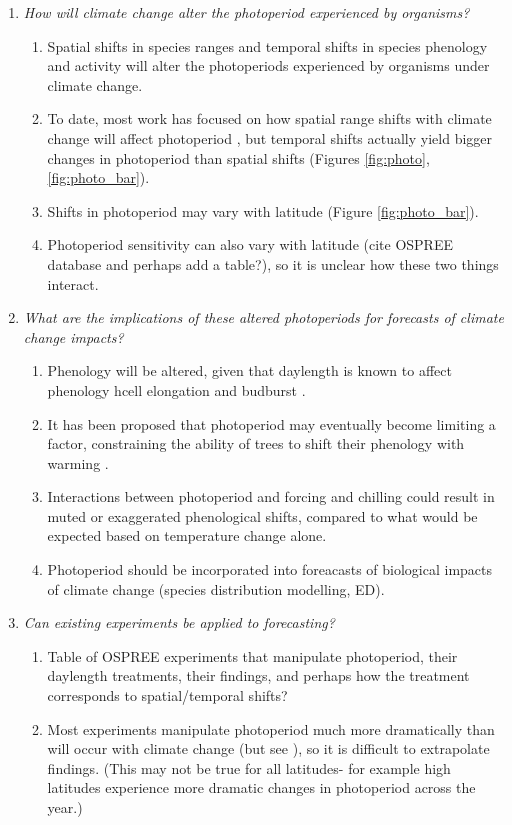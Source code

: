 \documentclass{article}
\begin{document}
\begin{enumerate}
\item\textit{How will climate change alter the photoperiod experienced by organisms?}
\begin{enumerate}
\item Spatial shifts in species ranges and temporal shifts in species phenology and activity will alter the photoperiods experienced by organisms under climate change.
\item  To date, most work has focused on how spatial range shifts with climate change will affect photoperiod \citep{saikkonen2012}, but temporal shifts actually yield bigger changes in photoperiod than spatial shifts  (Figures \ref{fig:photo},\ref{fig:photo_bar}).
\item Shifts in photoperiod may vary with latitude (Figure \ref{fig:photo_bar}). 
\item Photoperiod sensitivity can also vary with latitude (cite OSPREE database and perhaps add a table?), so it is unclear how these two things interact.
\end{enumerate}
\item\textit{What are the implications of these altered photoperiods for forecasts of climate change impacts?}
\begin{enumerate}
\item Phenology will be altered, given that daylength is known to affect phenology hcell elongation and budburst \citep{linkosalo2006,erwin1998,sidaway2010}.
\item It has been proposed that photoperiod may eventually become limiting a factor, constraining the ability of trees to shift their phenology with warming \citep{koerner2010,vitasse2013, morin2010}. 
\item Interactions between photoperiod and forcing and chilling could result in muted or exaggerated phenological shifts, compared to what would be expected based on temperature change alone.
\item Photoperiod should be incorporated into foreacasts of biological impacts of climate change (species distribution modelling, ED).
\end{enumerate}
\item\textit{Can existing experiments be applied to forecasting?}
\begin{enumerate}
\item Table of OSPREE experiments that manipulate photoperiod, their daylength treatments, their findings, and perhaps how the treatment corresponds to spatial/temporal shifts?
\item Most experiments manipulate photoperiod much more dramatically than will occur with climate change (but see \citep{basler2012}), so it is difficult to extrapolate findings. (This may not be true for all latitudes- for example high latitudes experience more dramatic changes in photoperiod across the year.)

\end{enumerate}
\end{enumerate}
\end{document}
